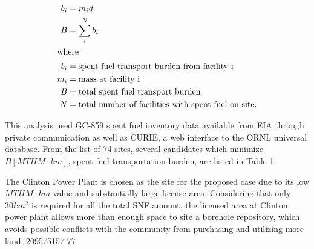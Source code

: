 \begin{align}
        b_i &= m_id\\
        B &= \sum_i^N b_i\\
        \intertext{where}
        b_i &= \mbox{spent fuel transport burden from facility i}\\
        m_i &= \mbox{mass at facility i}\\
        B &= \mbox{total spent fuel transport burden}\\
        N &= \mbox{total number of facilities with spent fuel on site.}
\end{align}

This analysis used GC-859 spent fuel inventory data available from \gls{EIA} 
through private communication \cite{domenico_GC-859_2016} as well as \gls{CURIE}, a web interface to 
the \gls{ORNL} universal database\cite{ornl_centralized_2016}.
From the list of 74 sites, several candidates which minimize $B [MTHM\cdot 
km]$, spent fuel transportation burden, are listed in Table 1.
    
    \begin{table}[h]
    	\centering
    	
    	\caption {Reactors with relatively small spent fuel transportation burden $ [MTHM\cdot km]$.}
    		\end {table}




The Clinton Power Plant is chosen as the site for the proposed case due to its
low $MTHM\cdot km$ value and substantially large license 
area\cite{nrc_chapter_2007}.
Considering that only
$30km^2$ is required for all the total \gls{SNF} amount, the licensed area at Clinton
power plant allows more than  enough space to site a borehole repository, which
avoids possible conflicts with the community from purchasing and utilizing more
land. 209575157-77

